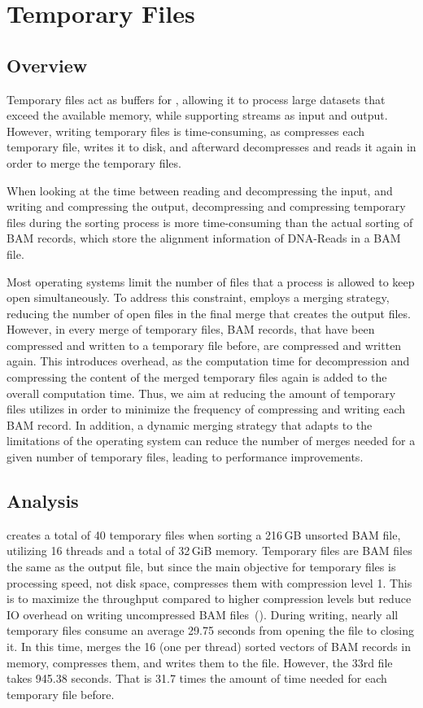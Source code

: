 \section{Temporary Files} \label{tempfiles}

\subsection{Overview}

Temporary files act as buffers for \sort, allowing it to process large datasets that exceed the available memory, while supporting streams as input and output. However, writing temporary files is time-consuming, as \sort compresses each temporary file, writes it to disk, and afterward decompresses and reads it again in order to merge the temporary files.

When looking at the time between reading and decompressing the input, and writing and compressing the output, decompressing and compressing temporary files during the sorting process is more time-consuming than the actual sorting of BAM records, which store the alignment information of DNA-Reads in a BAM file. 

Most operating systems limit the number of files that a process is allowed to keep open simultaneously. To address this constraint, \sort employs a merging strategy, reducing the number of open files in the final merge that creates the output files. However, in every merge of temporary files, BAM records, that have been compressed and written to a temporary file before, are compressed and written again. This introduces overhead, as the computation time for decompression and compressing the content of the merged temporary files again is added to the overall computation time. Thus, we aim at reducing the amount of temporary files \sort utilizes in order to minimize the frequency of \sort compressing and writing each BAM record. In addition, a dynamic merging strategy that adapts to the limitations of the operating system can reduce the number of merges needed for a given number of temporary files, leading to performance improvements.

\subsection{Analysis}
\sort creates a total of 40 temporary files when sorting a 216\,GB unsorted BAM file, utilizing 16 threads and a total of 32\,GiB memory. Temporary files are BAM files the same as the output file, but since the main objective for temporary files is processing speed, not disk space, \sort compresses them with compression level 1. This is to maximize the throughput compared to higher compression levels but reduce IO overhead on writing uncompressed BAM files~(). During writing, nearly all temporary files consume an average 29.75 seconds from opening the file to closing it. In this time, \sort merges the 16 (one per thread) sorted vectors of BAM records in memory, compresses them, and writes them to the file. However, the 33rd file takes 945.38 seconds. That is 31.7 times the amount of time needed for each temporary file before. 

